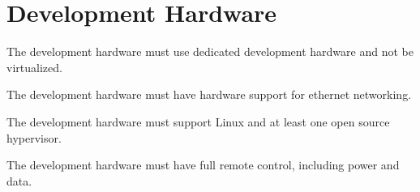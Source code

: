 









\section{Development Hardware}

\begin{hrsitems}
    \item The development hardware must use dedicated development hardware and not be virtualized.
    \item The development hardware must have hardware support for ethernet networking.
    \item The development hardware must support Linux and at least one open source hypervisor.
    \item The development hardware must have full remote control, including power and data.
\end{hrsitems}